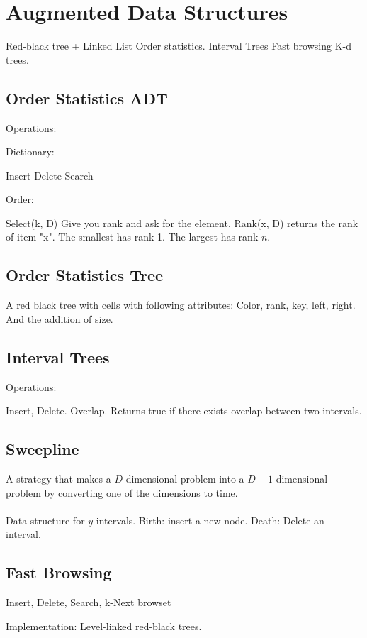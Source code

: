 \documentclass[class=scrartcl, crop=false]{standalone}
\date{2020-02-25}
\begin{document}
\section{Augmented Data Structures}
\begin{enumerate}
  \ii
  Red-black tree + Linked List
  \ii
  Order statistics.
  \ii
  Interval Trees
  \ii
  Fast browsing
  \ii
  K-d trees.
\end{enumerate} 

\subsection{Order Statistics ADT}

Operations: 
\begin{enumerate}
  \ii 
  Dictionary: 
  \begin{enumerate}
    \ii Insert
    \ii Delete
    \ii Search
  \end{enumerate} 
  \ii
  Order: 
  \begin{enumerate}
    \ii
    Select(k, D) Give you rank and ask for the element. 
    \ii
    Rank(x, D) returns the rank of item "x". The smallest has rank 1. The largest has rank $n$.
  \end{enumerate} 
\end{enumerate} 

\subsection{Order Statistics Tree}

A red black tree with cells with following attributes: Color, rank, key, left, right. And the addition of size.

\subsection{Interval Trees}

Operations:
\begin{enumerate}
  \ii
  Insert, Delete.
  \ii
  Overlap. Returns true if there exists overlap between two intervals.
\end{enumerate} 

\subsection{Sweepline}

A strategy that makes a $D$ dimensional problem into a $D - 1$ dimensional problem by converting one of the dimensions to time.
\\\\
Data structure for $y$-intervals. Birth: insert a new node. Death: Delete an interval.


\subsection{Fast Browsing}

Insert, Delete, Search, k-Next browset

Implementation: Level-linked red-black trees.
\end{document}
